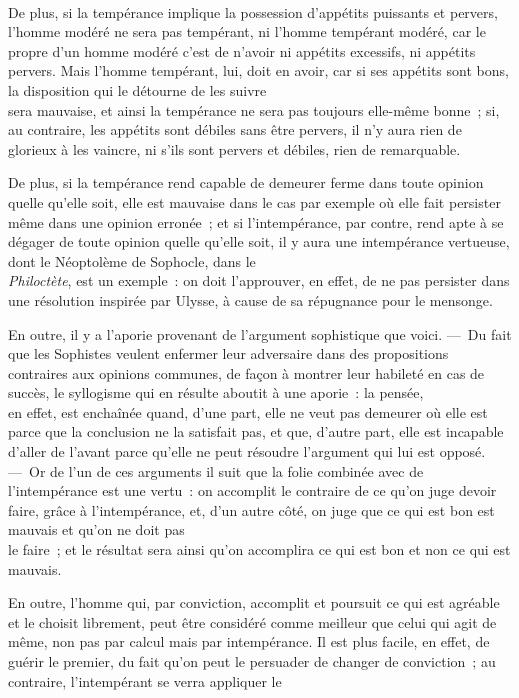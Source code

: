 \documentclass[french,twoside]{book} %
\begin{document}
\\
De plus, si la tempérance implique la possession d’appétits puissants et pervers, l’homme modéré ne sera pas tempérant, ni l’homme tempérant modéré, car le propre d’un homme modéré c’est de n’avoir ni appétits excessifs, ni appétits pervers. Mais l’homme tempérant, lui, doit en avoir, car si ses appétits sont bons, la disposition qui le détourne de les suivre \\
sera mauvaise, et ainsi la tempérance ne sera pas toujours elle-même bonne ; si, au contraire, les appétits sont débiles sans être pervers, il n’y aura rien de glorieux à les vaincre, ni s’ils sont pervers et débiles, rien de remarquable.\par
De plus, si la tempérance rend capable de demeurer ferme dans toute opinion quelle qu’elle soit, elle est mauvaise dans le cas par exemple où elle fait persister même dans une opinion erronée ; et si l’intempérance, par contre, rend apte à se dégager de toute opinion quelle qu’elle soit, il y aura une intempérance vertueuse, dont le Néoptolème de Sophocle, dans le \\
{\itshape Philoctète}, est un exemple : on doit l’approuver, en effet, de ne pas persister dans une résolution inspirée par Ulysse, à cause de sa répugnance pour le mensonge.\par
En outre, il y a l’aporie provenant de l’argument sophistique que voici. — Du fait que les Sophistes veulent enfermer leur adversaire dans des propositions contraires aux opinions communes, de façon à montrer leur habileté en cas de succès, le syllogisme qui en résulte aboutit à une aporie : la pensée, \\
en effet, est enchaînée quand, d’une part, elle ne veut pas demeurer où elle est parce que la conclusion ne la satisfait pas, et que, d’autre part, elle est incapable d’aller de l’avant parce qu’elle ne peut résoudre l’argument qui lui est opposé. — Or de l’un de ces arguments il suit que la folie combinée avec de l’intempérance est une vertu : on accomplit le contraire de ce qu’on juge devoir faire, grâce à l’intempérance, et, d’un autre côté, on juge que ce qui est bon est mauvais et qu’on ne doit pas \\
le faire ; et le résultat sera ainsi qu’on accomplira ce qui est bon et non ce qui est mauvais.\par
En outre, l’homme qui, par conviction, accomplit et poursuit ce qui est agréable et le choisit librement, peut être considéré comme meilleur que celui qui agit de même, non pas par calcul mais par intempérance. Il est plus facile, en effet, de guérir le premier, du fait qu’on peut le persuader de changer de conviction ; au contraire, l’intempérant se verra appliquer le \\
\end{document}
